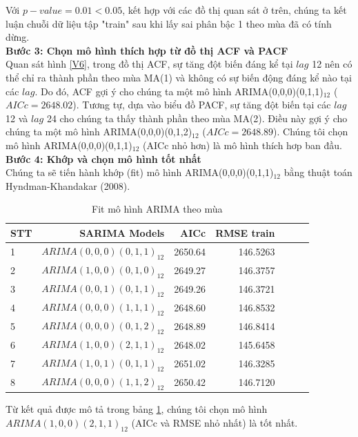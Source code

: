 \documentclass[12pt, a4paper,oneside]{book}
\theoremstyle{definition}
\begin{document}
Với $p-value = 0.01 < 0.05$, kết hợp với các đồ thị quan sát ở trên, chúng ta kết luận chuỗi dữ liệu tập "train" sau khi lấy sai phân bậc 1 theo mùa đã có tính dừng.\\
\textbf{Bước 3: Chọn mô hình thích hợp từ đồ thị ACF và PACF}\\
Quan sát hình \ref{V6}, trong đồ thị ACF, sự tăng đột biến đáng kể tại $lag$ 12 nên có thể chỉ ra thành phần theo mùa MA(1) và không có sự biến động đáng kể nào tại các $lag$. Do đó, ACF gợi ý cho chúng ta một mô hình ARIMA(0,0,0)(0,1,1)$_{12}$ ($AICc=2648.02$). Tương tự, dựa vào biểu đồ PACF, sự tăng đột biến tại các $lag$ 12 và $lag$ 24 cho chúng ta thấy thành phần theo mùa MA(2). Điều này gợi ý cho chúng ta một mô hình ARIMA(0,0,0)(0,1,2)$_{12}$ ($AICc=2648.89$). Chúng tôi chọn mô hình  ARIMA(0,0,0)(0,1,1)$_{12}$ (AICc nhỏ hơn) là mô hình thích hơp ban đầu.\\
\textbf{Bước 4: Khớp và chọn mô hình tốt nhất}\\
Chúng ta sẽ tiến hành khớp (fit) mô hình ARIMA(0,0,0)(0,1,1)$_{12}$ bằng thuật toán Hyndman-Khandakar (2008).
\begin{table}[!h]
	\caption{Fit mô hình ARIMA theo mùa}
	\label{fit_rainfall}
	\centering
	\fontsize{6}{10}\selectfont
	\begin{tabular}[t]{lrrrrrr}
		\toprule
		STT	& SARIMA Models & AICc & RMSE train\\
		\midrule
		\rowcolor{gray!6}  1 & $ARIMA(0,0,0)(0,1,1)_{12}$ & 2650.64  & 146.5263\\
		2 & $ARIMA(1,0,0)(0,1,0)_{12}$ & 2649.27 & 146.3757\\
		\rowcolor{gray!6}  3 & $ARIMA(0,0,1)(0,1,1)_{12}$ & 2649.26  & 146.3721\\
		4 & $ARIMA(0,0,0)(1,1,1)_{12}$ & 2648.60 & 146.8532\\
		\rowcolor{gray!6} 5  & $ARIMA(0,0,0)(0,1,2)_{12}$ & 2648.89 & 146.8414\\
		6 & $ARIMA(1,0,0)(2,1,1)_{12}$ & 2648.02 & 145.6458\\
        \rowcolor{gray!6} 7  & $ARIMA(1,0,1)(0,1,1)_{12}$ & 2651.02 & 146.3285\\
        8  & $ARIMA(0,0,0)(1,1,2)_{12}$ & 2650.42 & 146.7120\\
		\bottomrule
	\end{tabular}
\end{table}
Từ kết quả được mô tả trong bảng \ref{fit_rainfall}, chúng tôi chọn mô hình $ARIMA(1,0,0)(2,1,1)_{12}$ (AICc và RMSE nhỏ nhất) là tốt nhất.\\
\end{document}
